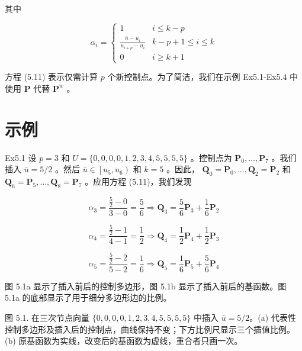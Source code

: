 \documentclass[../main.tex]{subfiles}
\begin{document}
其中

\[
{\alpha }_{i} = \left\{  \begin{matrix} 1 & i \leq  k - p \\  \frac{\bar{u} - {u}_{i}}{{u}_{i + p} - {u}_{i}} & k - p + 1 \leq  i \leq  k \\  0 & i \geq  k + 1 \end{matrix}\right.
\]

方程 (5.11) 表示仅需计算 \(p\) 个新控制点。为了简洁，我们在示例 Ex5.1-Ex5.4 中使用 \(\mathbf{P}\) 代替 \({\mathbf{P}}^{w}\) 。

\section*{示例}

Ex5.1 设 \(p = 3\) 和 \(U = \{ 0,0,0,0,1,2,3,4,5,5,5,5\}\) 。控制点为 \({\mathbf{P}}_{0},\ldots ,{\mathbf{P}}_{7}\) 。我们插入 \(\bar{u} = 5/2\) 。然后 \(\bar{u} \in  \left\lbrack  {{u}_{5},{u}_{6}}\right)\) 和 \(k = 5\) 。因此， \({\mathbf{Q}}_{0} = {\mathbf{P}}_{0},\ldots ,{\mathbf{Q}}_{2} = {\mathbf{P}}_{2}\) 和 \({\mathbf{Q}}_{6} = {\mathbf{P}}_{5},\ldots ,{\mathbf{Q}}_{8} = {\mathbf{P}}_{7}\) 。应用方程 (5.11)，我们发现

\[
{\alpha }_{3} = \frac{\frac{5}{2} - 0}{3 - 0} = \frac{5}{6} \Rightarrow  {\mathbf{Q}}_{3} = \frac{5}{6}{\mathbf{P}}_{3} + \frac{1}{6}{\mathbf{P}}_{2}
\]

\[
{\alpha }_{4} = \frac{\frac{5}{2} - 1}{4 - 1} = \frac{1}{2} \Rightarrow  {\mathbf{Q}}_{4} = \frac{1}{2}{\mathbf{P}}_{4} + \frac{1}{2}{\mathbf{P}}_{3}
\]

\[
{\alpha }_{5} = \frac{\frac{5}{2} - 2}{5 - 2} = \frac{1}{6} \Rightarrow  {\mathbf{Q}}_{5} = \frac{1}{6}{\mathbf{P}}_{5} + \frac{5}{6}{\mathbf{P}}_{4}
\]

图 5.1a 显示了插入前后的控制多边形，图 5.1b 显示了插入前后的基函数。图 5.1a 的底部显示了用于细分多边形边的比例。

\begin{center}
\begin{minipage}{18cm}
\vspace*{.6\baselineskip}
\centering
{}
\par\smallskip
图 5.1. 在三次节点向量 \(\{0,0,0,0,1,2,3,4,5,5,5,5\}\) 中插入 \(\bar u=5/2\)。(a) 代表性控制多边形及插入后的控制点，曲线保持不变；下方比例尺显示三个插值比例。(b) 原基函数为实线，改变后的基函数为虚线，重合者只画一次。
\end{minipage}
\end{center}
\end{document}
